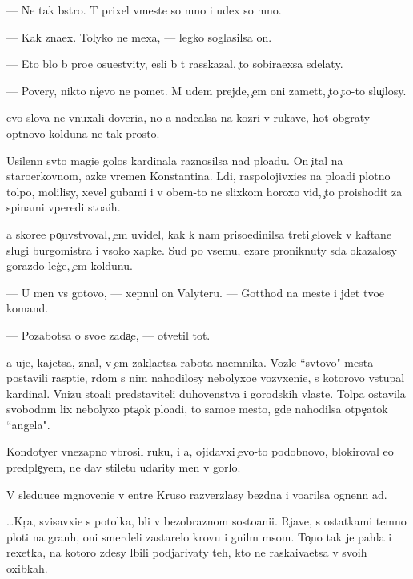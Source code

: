 \documentclass[10pt]{book}
\begin{document}
— Ne tak b{\yi}stro. T{\yi} prixel vmeste so mno{\y} i u{\y}dex so mno{\y}.

— Kak zna{\y}ex. Tolyko ne mexa{\y}, — legko soglasilsa on.

— Eto b{\yi}lo b{\yi} pro{\x}e osu{\x}estvity, {\y}esli b{\yi} t{\yi} rasskazal, {\c}to sobira{\y}exsa sdelaty.

— Povery, nikto ni{\c}evo ne po{\y}met. M{\yi} u{\y}dem prejde, {\c}em oni zamet{\ia}t, {\c}to {\c}to-to slu{\c}ilosy.

{\Y}evo slova ne vnuxali doveri{\y}a, no {\y}a nade{\y}alsa na koz{\yi}ri v rukave, hot{\ia} ob{\yi}graty op{\yi}tnovo kolduna ne tak prosto.

Usilenn{\yi}{\y} sv{\ia}to{\y} magi{\y}e{\y} golos kardinala raznosilsa nad plo{\x}ad{\y}u. On {\c}ital na staro{\q}erkovnom, {\y}az{\yi}ke vremen Konstantina. L{\iu}di, raspolojivxi{\y}es{\ia} na plo{\x}adi plotno{\y} tolpo{\y}, molilisy, xevel{\ia} gubami i v ob{\x}em-to ne slixkom horoxo vid{\ia}, {\c}to proishodit za spinami vperedi sto{\y}a{\x}ih.

{\Y}a skore{\y}e po{\c}uvstvoval, {\c}em uvidel, kak k nam priso{\y}edinilsa treti{\y} {\c}elovek v kaftane slugi burgomistra i v{\yi}soko{\y} xapke. Sud{\ia} po vsemu, {\C}ezare proniknuty s{\iu}da okazalosy gorazdo leg{\c}e, {\c}em koldunu.

— U men{\ia} vs{\e} gotovo, — xepnul on Valyteru. — Gotthod na meste i jdet tvo{\y}e{\y} komand{\yi}.

— Pozabotsa o svo{\y}e{\y} zada{\c}e, — otvetil tot.

{\Y}a uje, kajetsa, znal, v {\c}em zakl{\iu}{\c}a{\y}etsa rabota na{\y}emnika. Vozle ``sv{\ia}tovo" mesta postavili rasp{\ia}ti{\y}e, r{\ia}dom s nim nahodilosy nebolyxo{\y}e vozv{\yi}xeni{\y}e, s kotorovo v{\yi}stupal kardinal. Vnizu sto{\y}ali predstaviteli duhovenstva i gorodskih vlaste{\y}. Tolpa ostavila svobodn{\yi}m lix nebolyxo{\y} p{\ia}ta{\c}ok plo{\x}adi, to samo{\y}e mesto, gde nahodilsa otpe{\c}atok ``angela".

Kondotyer vnezapno v{\yi}brosil ruku, i {\y}a, ojidavxi{\y} {\c}evo-to podobnovo, blokiroval {\y}e{\y}o predple{\c}yem, ne dav stiletu udarity men{\ia} v gorlo.

V sledu{\y}u{\x}e{\y}e mgnoveni{\y}e v {\q}entre Kruso razverzlasy bezdna i vo{\q}arilsa ognenn{\yi}{\y} ad.



…Kr{\iu}{\c}{\y}a, svisavxi{\y}e s potolka, b{\yi}li v bezobraznom sosto{\y}ani{\y}i. Rjav{\yi}{\y}e, s ostatkami temno{\y} ploti na gran{\ia}h, oni smerdeli zastarelo{\y} krov{\y}u i gnil{\yi}m m{\ia}som. To{\c}no tak je pahla i rexetka, na kotoro{\y} zdesy l{\iu}bili podjarivaty teh, kto ne raska{\y}iva{\y}etsa v svo{\y}ih oxibkah.
\end{document}
